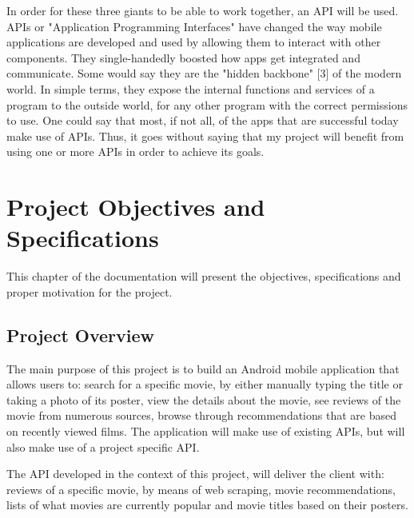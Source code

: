 \documentclass[12pt,a4paper,twoside]{report}
\begin{document}
In order for these three giants to be able to work together, an API will be used. APIs or "Application Programming Interfaces" have changed the way mobile applications are developed and used by allowing them to interact with other components. They single-handedly boosted how apps get integrated and communicate. Some would say they are the "hidden backbone" [3] of the modern world. In simple terms, they expose the internal functions and services of a program to the outside world, for any other program with the correct permissions to use. One could say that most, if not all, of the apps that are successful today make use of APIs. Thus, it goes without saying that my project will benefit from using one or more APIs in order to achieve its goals.


\chapter{Project Objectives and Specifications}


This chapter of the documentation will present the objectives, specifications and proper motivation for the project.
\section{Project Overview}

The main purpose of this project is to build an Android mobile application that allows users to: search for a specific movie, by either manually typing the title or taking a photo of its poster, view the details about the movie, see reviews of the movie from numerous sources, browse through recommendations that are based on recently viewed films. The application will make use of existing APIs, but will also make use of a project specific API. 

The API developed in the context of this project, will deliver the client with: reviews of a specific movie, by means of web scraping, movie recommendations, lists of what movies are currently popular and movie titles based on their posters.
\end{document}

